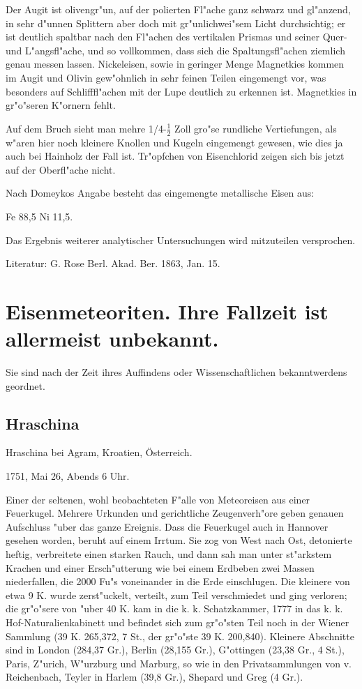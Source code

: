 \documentclass[a4paper, 11pt, oneside]{article}
\begin{document}
Der Augit ist olivengr"un, auf der polierten Fl"ache ganz schwarz und gl"anzend, in sehr d"unnen Splittern aber doch mit gr"unlichwei"sem Licht durchsichtig; er ist deutlich spaltbar nach den Fl"achen des vertikalen Prismas und seiner Quer- und L"angsfl"ache, und so vollkommen, dass sich die Spaltungsfl"achen ziemlich genau messen lassen. Nickeleisen, sowie in geringer Menge Magnetkies kommen im Augit und Olivin gew"ohnlich in sehr feinen Teilen eingemengt vor, was besonders auf Schlifffl"achen mit der Lupe deutlich zu erkennen ist. Magnetkies in gr"o"seren K"ornern fehlt.

Auf dem Bruch sieht man mehre 1/4-$\frac{1}{2}$ Zoll gro"se rundliche Vertiefungen, als w"aren hier noch kleinere Knollen und Kugeln eingemengt gewesen, wie dies ja auch bei Hainholz der Fall ist. Tr"opfchen von Eisenchlorid zeigen sich bis jetzt auf der Oberfl"ache nicht.

Nach Domeykos Angabe besteht das eingemengte metallische Eisen aus:

Fe 88,5  
Ni 11,5.

Das Ergebnis weiterer analytischer Untersuchungen wird mitzuteilen versprochen.

Literatur: G. Rose Berl. Akad. Ber. 1863, Jan. 15.

\section{Eisenmeteoriten. Ihre Fallzeit ist allermeist unbekannt.}

Sie sind nach der Zeit ihres Auffindens oder Wissenschaftlichen bekanntwerdens geordnet.

\subsection{Hraschina}

Hraschina bei Agram, Kroatien, Österreich.

1751, Mai 26, Abends 6 Uhr.

Einer der seltenen, wohl beobachteten F"alle von Meteoreisen aus einer Feuerkugel. Mehrere Urkunden und gerichtliche Zeugenverh"ore geben genauen Aufschluss "uber das ganze Ereignis. Dass die Feuerkugel auch in Hannover gesehen worden, beruht auf einem Irrtum. Sie zog von West nach Ost, detonierte heftig, verbreitete einen starken Rauch, und dann sah man unter st"arkstem Krachen und einer Ersch"utterung wie bei einem Erdbeben zwei Massen niederfallen, die 2000 Fu"s voneinander in die Erde einschlugen. Die kleinere von etwa 9 K. wurde zerst"uckelt, verteilt, zum Teil verschmiedet und ging verloren; die gr"o"sere von "uber 40 K. kam in die k. k. Schatzkammer, 1777 in das k. k. Hof-Naturalienkabinett und befindet sich zum gr"o"sten Teil noch in der Wiener Sammlung (39 K. 265,372, 7 St., der gr"o"ste 39 K. 200,840). Kleinere Abschnitte sind in London (284,37 Gr.), Berlin (28,155 Gr.), G"ottingen (23,38 Gr., 4 St.), Paris, Z"urich, W"urzburg und Marburg, so wie in den Privatsammlungen von v. Reichenbach, Teyler in Harlem (39,8 Gr.), Shepard und Greg (4 Gr.).
\end{document}
